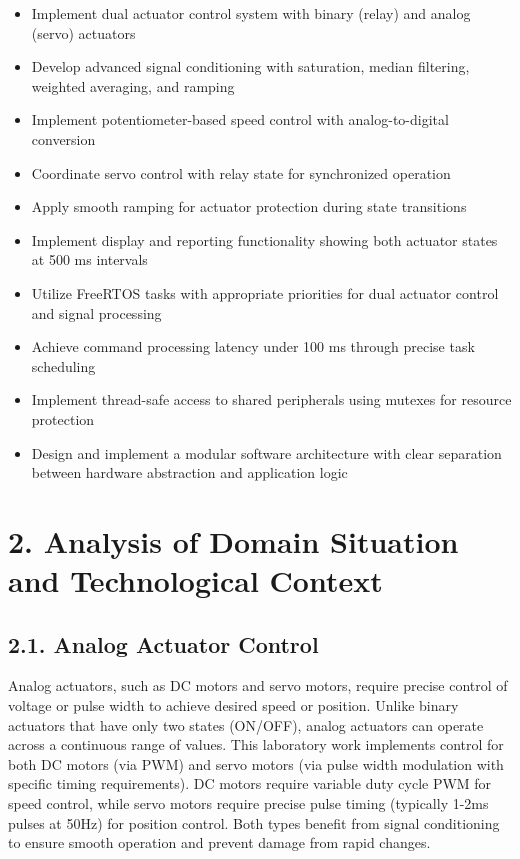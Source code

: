 \documentclass[12pt]{article}
\begin{document}
\begin{itemize}
    \item Implement dual actuator control system with binary (relay) and analog (servo) actuators
    \item Develop advanced signal conditioning with saturation, median filtering, weighted averaging, and ramping
    \item Implement potentiometer-based speed control with analog-to-digital conversion
    \item Coordinate servo control with relay state for synchronized operation
    \item Apply smooth ramping for actuator protection during state transitions
    \item Implement display and reporting functionality showing both actuator states at 500 ms intervals
    \item Utilize FreeRTOS tasks with appropriate priorities for dual actuator control and signal processing
    \item Achieve command processing latency under 100 ms through precise task scheduling
    \item Implement thread-safe access to shared peripherals using mutexes for resource protection
    \item Design and implement a modular software architecture with clear separation between hardware abstraction and application logic
\end{itemize}

\section*{2. Analysis of Domain Situation and Technological Context}

\subsection*{2.1. Analog Actuator Control}

Analog actuators, such as DC motors and servo motors, require precise control of voltage or pulse width to achieve desired speed or position. Unlike binary actuators that have only two states (ON/OFF), analog actuators can operate across a continuous range of values. This laboratory work implements control for both DC motors (via PWM) and servo motors (via pulse width modulation with specific timing requirements). DC motors require variable duty cycle PWM for speed control, while servo motors require precise pulse timing (typically 1-2ms pulses at 50Hz) for position control. Both types benefit from signal conditioning to ensure smooth operation and prevent damage from rapid changes.
\end{document}
